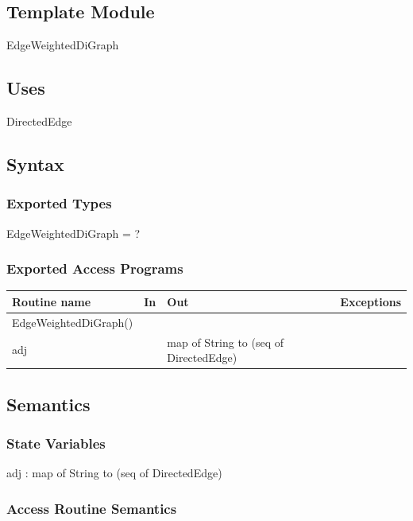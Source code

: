 \documentclass[12pt]{article}
\begin{document}
\subsection*{Template Module}

EdgeWeightedDiGraph

\subsection* {Uses}

DirectedEdge

\subsection* {Syntax}

\subsubsection* {Exported Types}

EdgeWeightedDiGraph = ?

\subsubsection* {Exported Access Programs}

\begin{tabular}{| l | l | l | l |}
\hline
\textbf{Routine name} & \textbf{In} & \textbf{Out} & \textbf{Exceptions}\\
\hline
EdgeWeightedDiGraph() & ~ & ~ & ~\\
\hline
adj & ~ & map of String to (seq of DirectedEdge) & ~\\
\hline
\end{tabular}

\subsection* {Semantics}

\subsubsection* {State Variables}

adj : map of String to (seq of DirectedEdge)

\subsubsection* {Access Routine Semantics}
\end{document}
